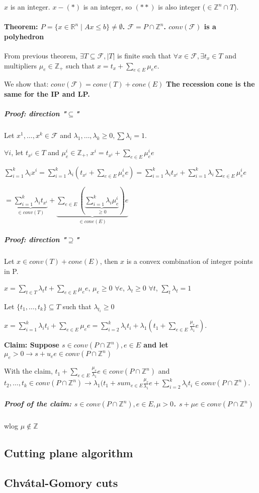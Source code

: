 \documentclass[main]{subfiles}
\begin{document}
$x$ is an integer. $x - (*)$ is an integer, so $(**)$ is also integer ($\in \mathbb{Z}^n \cap T$).

\paragraph{Theorem: $P = \{ x \in \mathbb{R}^n \mid Ax \leq b\} \neq \emptyset$. $\mathcal{F} = P \cap \mathbb{Z}^n$. $conv(\mathcal{F})$ is a polyhedron}

From previous theorem, $\exists T \subseteq \mathcal{F}, |T|$ is finite such that $\forall x \in \mathcal{F}, \exists t_x \in T$ and multipliers $\mu_e \in \mathbb{Z}_+$ such that $x = t_x + \sum_{e \in E} \mu_e e$.

We show that: $conv(\mathcal{F}) = conv(T) + cone(E)$
\textbf{The recession cone is the same for the IP and LP.}

\subparagraph{Proof: direction "$\subseteq$"}
Let $x^1, \dots, x^k \in \mathcal{F}$ and $\lambda_1, \dots, \lambda_k \geq 0, \sum \lambda_i = 1$.

$\forall i$, let $t_{x^i} \in T$ and $\mu_e^i \in \mathbb{Z}_+$, $x^i = t_{x^i} + \sum_{e \in E} \mu_e^i e$

$\sum_{i = 1}^{k} \lambda_i x^i = \sum_{i = 1}^{k} \lambda_i (t_{x^i} + \sum_{e \in E} \mu_e^i e) = \sum_{i =1}^k \lambda_i t_{x^i} + \sum_{i=1}^k \lambda_i \sum_{e \in E} \mu_e^i e$

$= \underbrace{ \sum_{i=1}^k \lambda_i t_{x^i}}_{\in conv(T)} + \underbrace{\sum_{e \in E}(\underbrace{\sum_{i =1}^k \lambda_i \mu_e^i}_{\geq 0})e}_{\in cone(E)}$

\subparagraph{Proof: direction "$\supseteq$"}
Let $x \in conv(T) + cone(E)$, then $x$ is a convex combination of integer points in P.

$x = \sum_{t \in T} \lambda_t t + \sum_{e \in E} \mu_e e$, $\mu_e \geq 0$ $\forall e$, $\lambda_t \geq 0$ $\forall t$, $\sum_{t}\lambda_t = 1$

Let $\{t_1, \dots, t_k\} \subseteq T$ such that $\lambda_{t_i} \geq 0$

$x = \sum_{i=1}^k \lambda_i t_i + \sum_{e \in E} \mu_e e = \sum_{i=2}^k \lambda_i t_i + \lambda_1 (t_1 + \sum_{e \in E} \frac{\mu_e}{\lambda_1} e)$.


\textbf{Claim: Suppose $s \in conv(P \cap \mathbb{Z}^n), e \in E$ and let $\mu_e > 0 \rightarrow s + u_e e \in conv(P \cap \mathbb{Z}^n)$}

With the claim, $t_1 + \sum_{e \in E} \frac{\mu_e}{\lambda_1}e \in conv(P \cap \mathbb{Z}^n)$ and $t_2, \dots, t_k \in conv(P \cap \mathbb{Z}^n) \rightarrow \lambda_1(t_1 + sum_{e \in E}\frac{\mu_e}{\lambda_1}e + \sum_{i =2}^k \lambda_i t_i \in conv(P \cap \mathbb{Z}^n)$.

\subparagraph{Proof of the claim: $s \in conv(P \cap \mathbb{Z}^n), e \in E, \mu > 0$. $s + \mu e \in conv(P \cap \mathbb{Z}^n)$}
wlog $\mu \notin \mathbb{Z}$

\subsection{Cutting plane algorithm}

\subsection{Chvátal-Gomory cuts}
\end{document}
